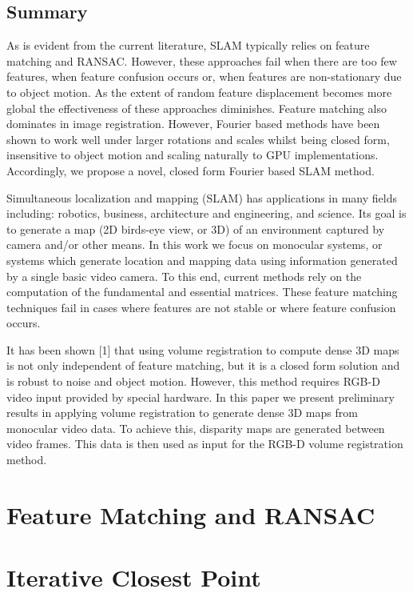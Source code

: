 \subsection{Summary}
As is evident from the current literature, SLAM typically relies on feature matching and RANSAC. However, these approaches fail when there are too few features, when feature confusion occurs or, when features are non-stationary due to object motion. As the extent of random feature displacement becomes more global the effectiveness of these approaches diminishes. Feature matching also dominates in image registration. However, Fourier based methods have been shown to work well under larger rotations and scales \cite{Gonzalez11Improving} whilst being closed form, insensitive to object motion and scaling naturally to GPU implementations. Accordingly, we propose a novel, closed form Fourier based SLAM method.

Simultaneous localization and mapping (SLAM) has applications in many fields including: robotics, business, architecture and engineering, and science. Its goal is to generate a map (2D birds-eye view, or 3D) of an environment captured by camera and/or other means. In this work we focus on monocular systems, or systems which generate location and mapping data using information generated by a single basic video camera. To this end, current methods rely on the computation of the fundamental and essential matrices. These feature matching techniques fail in cases where features are not stable or where feature confusion occurs. 

It has been shown [1] that using volume registration to compute dense 3D maps is not only independent of feature matching, but it is a closed form solution and is robust to noise and object motion. However, this method requires RGB-D video input provided by special hardware. In this paper we present preliminary results in applying volume registration to generate dense 3D maps from monocular video data. To achieve this, disparity maps are generated between video frames. This data is then used as input for the RGB-D volume registration method.

\section{Feature Matching and RANSAC}

\section{Iterative Closest Point}

